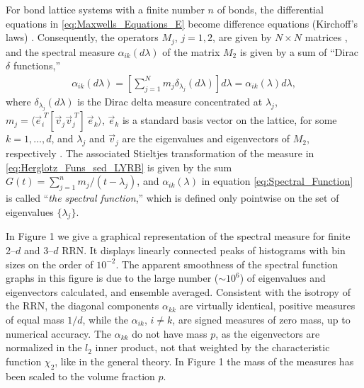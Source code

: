 \documentclass[english,12pt,jmp,graphicx]{revtex4-1}
\begin{document}
For bond lattice systems with a finite number $n$ of 
bonds, the differential equations in \eqref{eq:Maxwells_Equations_E}
become difference equations (Kirchoff's laws)
\cite{Golden:JMP-5627}.
Consequently, the operators $M_j$, $j=1,2$, are given by $N\times N$
matrices \cite{Golden:JoB:337,Golden:JMP-5627}, and 
the spectral measure $\alpha_{ik}(d\lambda)$ of the matrix $M_2$ is
given by a sum of ``Dirac $\delta$ functions,''
%
\begin{align}\label{eq:Spectral_Function}
  \alpha_{ik}(d\lambda)=
    \left[\sum_{j=1}^N m_j \delta_{\lambda_j}(d\lambda)\right]d\lambda
      =\alpha_{ik}(\lambda)d\lambda,
\end{align}
%
where $\delta_{\lambda_j}(d\lambda)$ is the Dirac delta measure concentrated at $\lambda_j$,
$m_j=\langle\vec{e}_i^{\;T}[\vec{v}_j\vec{v}_j^{\;T}]\,\vec{e}_k\rangle$, 
$\vec{e}_k$ is a standard basis vector on the lattice, for some
$k=1,\ldots,d$, and $\lambda_j$ and $\vec{v}_j$ are the eigenvalues and
eigenvectors of $M_2$, 
respectively \cite{Golden:JoB:337}. 
The associated Stieltjes transformation of the measure in
\eqref{eq:Herglotz_Funs_sed_LYRB} is  
given by the sum $G(t)=\sum_{j=1}^nm_j/(t-\lambda_j)$, and $\alpha_{ik}(\lambda)$ in equation
\eqref{eq:Spectral_Function} is called ``\emph{the spectral
  function},'' which is defined only pointwise on the set of
eigenvalues $\{\lambda_j\}$.

In Figure 1 we give a graphical
representation of the spectral measure for finite 2--$d$ and 3--$d$
RRN. It displays linearly connected peaks of histograms with bin
sizes on the order of $10^{-2}$. The apparent smoothness of the
spectral function graphs in this figure is due to the large number
($\sim10^6$) of eigenvalues and eigenvectors calculated, and ensemble
averaged. Consistent with the isotropy of the
RRN, the diagonal components $\alpha_{kk}$ are virtually identical,
positive measures of equal mass $1/d$, while the $\alpha_{ik}$, $i\neq k$, are
signed measures of zero mass, up to numerical accuracy. The $\alpha_{kk}$
do not have mass $p$, as the eigenvectors are normalized in the $l_2$
inner product, not that weighted by the characteristic function $\chi_2$,
like in the general theory. In Figure 1 the mass of the measures has
been scaled to the volume fraction $p$.  
\end{document}
